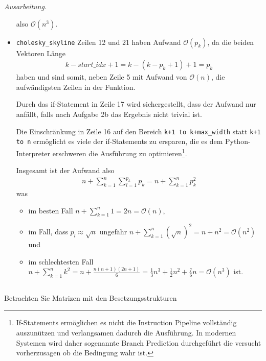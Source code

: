 \documentclass[titlepage]{article}
\newenvironment{ausarbeitung}{\vspace{3mm}\noindent\textit{Ausarbeitung.}}{}
\begin{document}
\begin{ausarbeitung}
\begin{itemize}
		also $\mathcal{O}(n^3)$.
		
		\item \texttt{cholesky\_skyline} Zeilen 12 und 21 haben Aufwand $\mathcal{O}(p_k)$, da die beiden Vektoren Länge
		\begin{align*}
			k - start\_idx + 1 = k - (k - p_k + 1) + 1 = p_k
		\end{align*}
		haben und sind somit, neben Zeile 5 mit Aufwand von $\mathcal{O}(n)$, die aufwändigsten Zeilen in der Funktion.
		
		Durch das if-Statement in Zeile 17 wird sichergestellt, dass der Aufwand nur anfällt, falls nach Aufgabe 2b das Ergebnis nicht trivial ist.
		
		Die Einschränkung in Zeile 16 auf den Bereich \texttt{k+1 to k+max\_width} statt \texttt{k+1 to n} ermöglicht es viele der if-Statements zu ersparen, die es dem Python-Interpreter erschweren die Ausführung zu optimieren\footnote{If-Statements ermöglichen es nicht die Instruction Pipeline vollständig auszunützen und verlangsamen dadurch die Ausführung. In modernen Systemen wird daher sogenannte Branch Prediction durchgeführt die versucht vorherzusagen ob die Bedingung wahr ist.}.
		
		Insgesamt ist der Aufwand also
		\begin{align*}
			n + \sum_{k=1}^{n} \sum_{l=1}^{p_k}p_k = n + \sum_{k=1}^{n} p_k^2
		\end{align*}
		was
		\begin{itemize}
			\item im besten Fall $n + \sum_{k=1}^{n} 1 = 2n = \mathcal{O}(n)$,
			\item im Fall, dass $p_l \approx \sqrt{n}$ ungefähr $n + \sum_{k=1}^{n}(\sqrt{n})^2 = n + n^2 = \mathcal{O}(n^2)$ und
			\item im schlechtesten Fall $n + \sum_{k=1}^{n}k^2 = n + \frac{n(n+1)(2n+1)}{6} = \frac{1}{3}n^3 + \frac{1}{2}n^2 + \frac{7}{6}n = \mathcal{O}(n^3)$ ist.
		\end{itemize}
	\end{itemize}
	
\end{ausarbeitung}


\subsection{}
Betrachten Sie Matrizen mit den Besetzungsstrukturen
\end{document}
